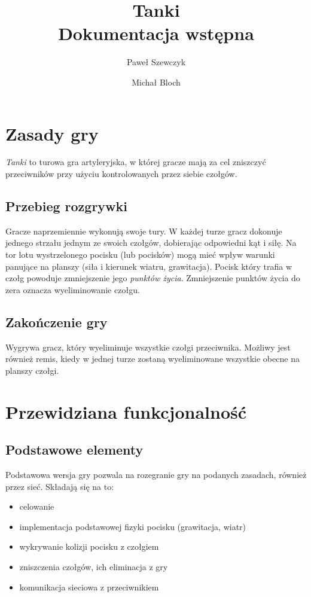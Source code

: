 \documentclass[12pt,a4paper]{article}
\title{Tanki\\
Dokumentacja wstępna }
\author{
Paweł Szewczyk
\and
Michał Bloch
}
\begin{document}
\maketitle

\section{Zasady gry}
\emph{Tanki} to turowa gra artyleryjska, w której gracze mają za cel zniszczyć przeciwników przy użyciu kontrolowanych przez siebie czołgów.
\subsection{Przebieg rozgrywki}
Gracze naprzemiennie wykonują swoje tury.
W każdej turze gracz dokonuje jednego strzału jednym ze swoich czołgów, dobierając odpowiedni kąt i siłę. Na tor lotu wystrzelonego pocisku (lub pocisków) mogą mieć wpływ warunki panujące na planszy (siła i kierunek wiatru, grawitacja). Pocisk który trafia w czołg powoduje zmniejszenie jego \emph{punktów życia}. Zmniejszenie punktów życia do zera oznacza wyeliminowanie czołgu.
\subsection{Zakończenie gry}
Wygrywa gracz, który wyeliminuje wszystkie czołgi przeciwnika. Możliwy jest również remis, kiedy w jednej turze zostaną wyeliminowane wszystkie obecne na planszy czołgi.

\section{Przewidziana funkcjonalność}
\subsection{Podstawowe elementy}
Podstawowa wersja gry pozwala na rozegranie gry na podanych zasadach, również przez sieć. Składają się na to:
\begin{itemize}
\item celowanie
\item implementacja podstawowej fizyki pocisku (grawitacja, wiatr)
\item wykrywanie kolizji pocisku z czołgiem
\item zniszczenia czołgów, ich eliminacja z gry
\item komunikacja sieciowa z przeciwnikiem
\end{itemize}
\end{document}
